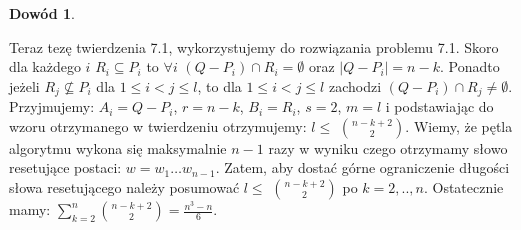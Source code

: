 \documentclass[12pt,a4paper]{article}
\newtheorem{dw}{Dow\'od}[section]
\begin{document}
\begin{dw}
\end{dw}

Teraz tez\k{e} twierdzenia 7.1, wykorzystujemy do rozwi\k{a}zania problemu 7.1. Skoro dla ka\.zdego $i$ $R_{i}\subseteq P_{i}$ to $\forall i$ $(Q-P_{i})\cap R_{i}=\emptyset$ oraz $|Q-P_{i}|=n-k$. Ponadto je\.zeli $R_{j}\not\subseteq P_{i}$ dla $1\leq i<j\leq l$, to dla $1\leq i<j\leq l$ zachodzi $(Q-P_{i})\cap R_{j}\neq\emptyset$. Przyjmujemy: $A_{i}=Q-P_{i}$, $r=n-k$, $B_{i}=R_{i}$, $s=2$, $m=l$ i podstawiaj\k{a}c do wzoru otrzymanego w twierdzeniu otrzymujemy: $l\leq$ ${n-k+2}\choose{2}$. Wiemy, \.ze p\k{e}tla algorytmu wykona si\k{e} maksymalnie $n-1$ razy w wyniku czego otrzymamy s{\l}owo resetuj\k{a}ce postaci: $w=w_{1}\ldots w_{n-1}$. Zatem, aby dosta\'c g\'orne ograniczenie d{\l}ugo\'sci s{\l}owa resetuj\k{a}cego nale\.zy posumowa\'c $l\leq$ ${n-k+2}\choose{2}$ po $k=2,..,n$. Ostatecznie mamy: $\sum_{k=2}^{n}$${n-k+2}\choose{2}$$=\frac{n^{3}-n}{6}$.
\end{document}
